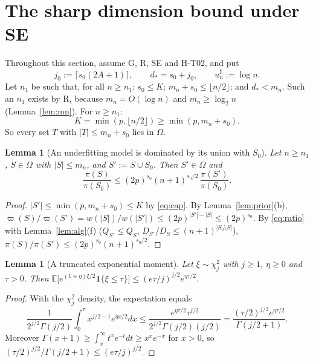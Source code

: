 \documentclass[11pt]{article}
\newtheorem{lemma}[theorem]{Lemma}
\theoremstyle{remark}
\newcommand{\E}{\mathbb E}
\newcommand{\vp}{\varpi}
\begin{document}
\section{The sharp dimension bound under SE}\label{sec:sharp}

Throughout this section, assume G, R, SE and H-T02, and put
\[
j_0:=\lceil s_0(2A+1)\rceil,\qquad d_\ast=s_0+j_0,\qquad u^\sharp_n:=\log n .
\]
Let $n_1$ be such that, for all $n\ge n_1$: $s_0\le K$; $m_n+s_0\le\lfloor n/2\rfloor$; and $d_\ast<m_n$. Such an $n_1$ exists by R, because $m_n=O(\log n)$ and $m_n\ge\log_2n$ (Lemma~\ref{lem:mn}). For $n\ge n_1$:
\begin{equation}\label{eq:cap}
K=\min(p,\lfloor n/2\rfloor)\ge\min(p,m_n+s_0).
\end{equation}
So every set $T$ with $|T|\le m_n+s_0$ lies in $\Omega$.

\begin{lemma}[An underfitting model is dominated by its union with $S_0$]\label{lem:union}
Let $n\ge n_1$, $S\in\Omega$ with $|S|\le m_n$, and $S':=S\cup S_0$. Then $S'\in\Omega$ and
\[
\frac{\pi(S)}{\pi(S_0)}\le(2p)^{s_0}(n+1)^{s_0/2}\,\frac{\pi(S')}{\pi(S_0)} .
\]
\end{lemma}

\begin{proof}
$|S'|\le\min(p,m_n+s_0)\le K$ by \eqref{eq:cap}. By Lemma~\ref{lem:prior}(b), $\vp(S)/\vp(S')=w(|S|)/w(|S'|)\le(2p)^{|S'|-|S|}\le(2p)^{s_0}$. By \eqref{eq:ratio} with Lemma~\ref{lem:alg}(f) ($Q_{S'}\le Q_S$, $D_{S'}/D_S\le(n+1)^{|S_0\setminus S|}$), $\pi(S)/\pi(S')\le(2p)^{s_0}(n+1)^{s_0/2}$.
\end{proof}

\begin{lemma}[A truncated exponential moment]\label{lem:trunc}
Let $\xi\sim\chi^2_j$ with $j\ge1$, $\eta\ge0$ and $\tau>0$. Then $\E\big[e^{(1+\eta)\xi/2}\mathbf 1\{\xi\le\tau\}\big]\le(e\tau/j)^{j/2}e^{\eta\tau/2}$.
\end{lemma}

\begin{proof}
With the $\chi^2_j$ density, the expectation equals
\[
\frac1{2^{j/2}\Gamma(j/2)}\int_0^\tau x^{j/2-1}e^{\eta x/2}dx\le\frac{e^{\eta\tau/2}\tau^{j/2}}{2^{j/2}\Gamma(j/2)(j/2)}=\frac{(\tau/2)^{j/2}e^{\eta\tau/2}}{\Gamma(j/2+1)} .
\]
Moreover $\Gamma(x+1)\ge\int_x^\infty t^xe^{-t}dt\ge x^xe^{-x}$ for $x>0$, so $(\tau/2)^{j/2}/\Gamma(j/2+1)\le(e\tau/j)^{j/2}$.
\end{proof}
\end{document}
